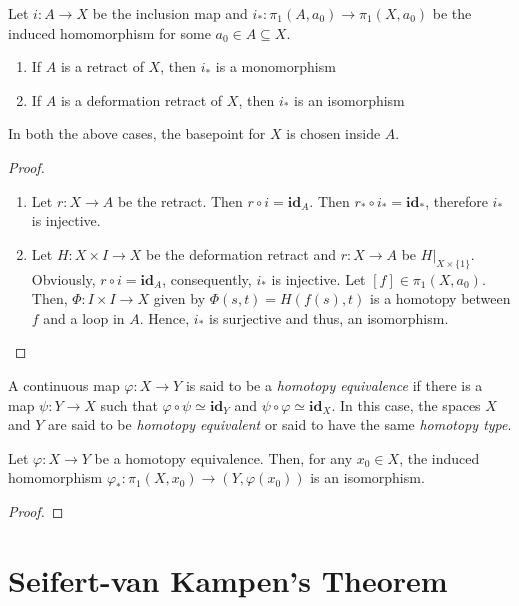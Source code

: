 \begin{theorem}
    Let $i: A\to X$ be the inclusion map and $i_*:\pi_1(A,a_0)\to\pi_1(X,a_0)$ be the induced homomorphism for some $a_0\in A\subseteq X$. 
    \begin{enumerate}[label=(\alph*)]
    \item If $A$ is a retract of $X$, then $i_*$ is a monomorphism 
    \item If $A$ is a deformation retract of $X$, then $i_*$ is an isomorphism 
    \end{enumerate}
    In both the above cases, the basepoint for $X$ is chosen inside $A$.
\end{theorem}
\begin{proof}
\hfill 
\begin{enumerate}[label=(\alph*)]
\item Let $r: X\to A$ be the retract. Then $r\circ i = \mathbf{id}_A$. Then $r_*\circ i_* = \mathbf{id}_*$, therefore $i_*$ is injective.

\item Let $H: X\times I\to X$ be the deformation retract and $r: X\to A$ be $H|_{X\times\{1\}}$. Obviously, $r\circ i = \mathbf{id}_A$, consequently, $i_*$ is injective. Let $[f]\in\pi_1(X,a_0)$. Then, $\Phi:I\times I\to X$ given by $\Phi(s,t) = H(f(s),t)$ is a homotopy between $f$ and a loop in $A$. Hence, $i_*$ is surjective and thus, an isomorphism.
\end{enumerate}
\end{proof}

\begin{definition}
    A continuous map $\varphi: X\to Y$ is said to be a \textit{homotopy equivalence} if there is a map $\psi: Y\to X$ such that $\varphi\circ \psi\simeq\mathbf{id}_Y$ and $\psi\circ \varphi\simeq\mathbf{id}_X$. In this case, the spaces $X$ and $Y$ are said to be \textit{homotopy equivalent} or said to have the same \textit{homotopy type}.
\end{definition}

\begin{theorem}
    Let $\varphi: X\to Y$ be a homotopy equivalence. Then, for any $x_0\in X$, the induced homomorphism $\varphi_*:\pi_1(X,x_0)\to(Y,\varphi(x_0))$ is an isomorphism.
\end{theorem}
\begin{proof}
\end{proof}

\section{Seifert-van Kampen's Theorem}

